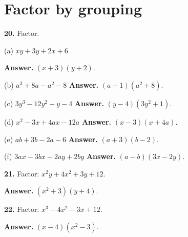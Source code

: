 \documentclass{ximera}
\begin{document}
\section*{Factor by grouping}

\begin{problem}

\textbf{20.} Factor.

(a) $xy+3y+2x+6$ \qquad

\begin{hint}
\textbf{Answer.} $(x+3)(y+2)$.

(b) $a^{3}+8a-a^{2}-8$ \qquad \textbf{Answer.} $(a-1)\left(a^{2}+8\right)$.

(c) $3y^{3}-12y^{2}+y-4$ \qquad \textbf{Answer.} $(y-4)\left(3y^{2}+1\right)$.

(d) $x^{2}-3x+4ax-12a$ \qquad \textbf{Answer.} $(x-3)(x+4a)$.

(e) $ab+3b-2a-6$ \qquad \textbf{Answer.} $(a+3)(b-2)$.

(f) $3ax-3bx-2ay+2by$ \qquad \textbf{Answer.} $(a-b)(3x-2y)$.
\end{hint}
\end{problem}

\begin{problem}

\textbf{21.} Factor: $x^{2}y+4x^{2}+3y+12$. \qquad

\begin{hint}
\textbf{Answer.}
$\left(x^{2}+3\right)(y+4)$.
\end{hint}
\end{problem}

\begin{problem}

\textbf{22.} Factor: $x^{3}-4x^{2}-3x+12$. \qquad

\begin{hint}
\textbf{Answer.}
$(x-4)\left(x^{2}-3\right)$.
\end{hint}
\end{problem}
\end{document}
